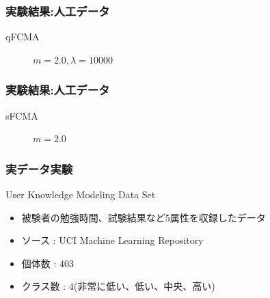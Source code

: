 \documentclass[13pt,dvipdfmx]{beamer}
\begin{document}
\begin{frame}\frametitle{実験結果:人工データ}
  \begin{block}{qFCMA}
   \begin{figure}[htbp]
 \begin{minipage}{0.32\hsize}
  \begin{center}
  \end{center}
  \captionsetup{labelformat=empty,labelsep=none}
  \caption{$m=1.1, \lambda=10.0$}
  \label{fig:one}
 \end{minipage}
 \begin{minipage}{0.32\hsize}
  \begin{center}
  \end{center}
  \captionsetup{labelformat=empty,labelsep=none}
  \caption{$m=2.0, \lambda=10.0$}
  \label{fig:two}
 \end{minipage}
 \begin{minipage}{0.32\hsize}
  \begin{center}
  \end{center}
  \captionsetup{labelformat=empty,labelsep=none}
  \caption{$m=2.0, \lambda=10000$}
  \label{fig:three}
 \end{minipage}
\end{figure}
 \end{block}
\end{frame}

\begin{frame}\frametitle{実験結果:人工データ}
  \begin{block}{sFCMA}
   \begin{figure}[htbp]
    \begin{center}
   \end{center}
    \captionsetup{labelformat=empty,labelsep=none}
   \caption{$m=2.0$}
  \end{figure}
 \end{block}
\end{frame}

\begin{frame}\frametitle{実データ実験}
  \begin{block}{User Knowledge Modeling Data Set}
    \begin{itemize}
    \item 被験者の勉強時間、試験結果など5属性を収録したデータ
    \item ソース : UCI  Machine Learning Repository
    \item 個体数 : 403
    \item クラス数 : 4(非常に低い、低い、中央、高い)
    \end{itemize}
  \end{block}
\end{frame}
\end{document}
